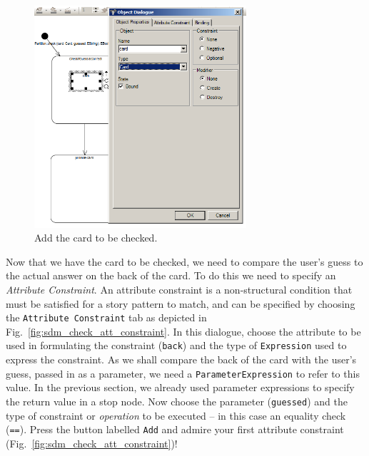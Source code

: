 \begin{figure}[htbp]
\begin{center}
  \includegraphics[width=0.7\textwidth]{pics/sdmBilder/check/sdm17RAW}
  \caption{Add the card to be checked.}  
  \label{fig:sdm_check_addCard}
\end{center}
\end{figure}

Now that we have the card to be checked, we need to compare the user's guess to
the actual answer on the back of the card.  To do this we need to specify an
\emph{Attribute Constraint}.  An attribute constraint is a
non-structural condition that must be satisfied for a story pattern to match,
and can be specified by choosing the \texttt{Attribute Constraint} tab as
depicted in Fig.~\ref{fig:sdm_check_att_constraint}.  In this dialogue, choose
the attribute to be used in formulating the constraint (\texttt{back}) and the
type of \texttt{Expression} used to express the constraint.  As we shall compare
the back of the card with the user's guess, passed in as a parameter, we need a
\texttt{ParameterExpression} to refer to this value.  In the previous section,
we already used parameter expressions to specify the return value in a stop
node.  Now choose the parameter (\texttt{guessed}) and the type of
constraint or \emph{operation} to be executed -- in this case an equality check
(\texttt{==}). Press the button labelled \texttt{Add} and admire your first
attribute constraint (Fig.~\ref{fig:sdm_check_att_constraint})!

